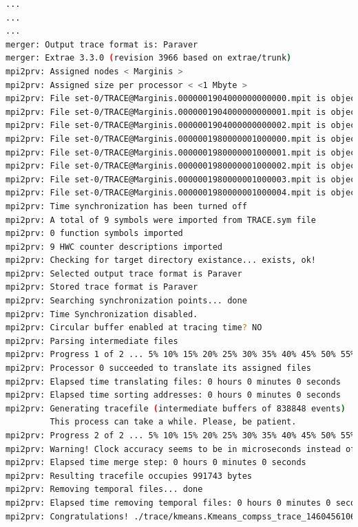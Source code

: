 \begin{lstlisting}[language=bash]
...
...
...
merger: Output trace format is: Paraver
merger: Extrae 3.3.0 (revision 3966 based on extrae/trunk)
mpi2prv: Assigned nodes < Marginis >
mpi2prv: Assigned size per processor < <1 Mbyte >
mpi2prv: File set-0/TRACE@Marginis.0000001904000000000000.mpit is object 1.1.1 on node Marginis assigned to processor 0
mpi2prv: File set-0/TRACE@Marginis.0000001904000000000001.mpit is object 1.1.2 on node Marginis assigned to processor 0
mpi2prv: File set-0/TRACE@Marginis.0000001904000000000002.mpit is object 1.1.3 on node Marginis assigned to processor 0
mpi2prv: File set-0/TRACE@Marginis.0000001980000001000000.mpit is object 1.2.1 on node Marginis assigned to processor 0
mpi2prv: File set-0/TRACE@Marginis.0000001980000001000001.mpit is object 1.2.2 on node Marginis assigned to processor 0
mpi2prv: File set-0/TRACE@Marginis.0000001980000001000002.mpit is object 1.2.3 on node Marginis assigned to processor 0
mpi2prv: File set-0/TRACE@Marginis.0000001980000001000003.mpit is object 1.2.4 on node Marginis assigned to processor 0
mpi2prv: File set-0/TRACE@Marginis.0000001980000001000004.mpit is object 1.2.5 on node Marginis assigned to processor 0
mpi2prv: Time synchronization has been turned off
mpi2prv: A total of 9 symbols were imported from TRACE.sym file
mpi2prv: 0 function symbols imported
mpi2prv: 9 HWC counter descriptions imported
mpi2prv: Checking for target directory existance... exists, ok!
mpi2prv: Selected output trace format is Paraver
mpi2prv: Stored trace format is Paraver
mpi2prv: Searching synchronization points... done
mpi2prv: Time Synchronization disabled.
mpi2prv: Circular buffer enabled at tracing time? NO
mpi2prv: Parsing intermediate files
mpi2prv: Progress 1 of 2 ... 5% 10% 15% 20% 25% 30% 35% 40% 45% 50% 55% 60% 65% 70% 75% 80% 85% 90% 95% done
mpi2prv: Processor 0 succeeded to translate its assigned files
mpi2prv: Elapsed time translating files: 0 hours 0 minutes 0 seconds
mpi2prv: Elapsed time sorting addresses: 0 hours 0 minutes 0 seconds
mpi2prv: Generating tracefile (intermediate buffers of 838848 events)
         This process can take a while. Please, be patient.
mpi2prv: Progress 2 of 2 ... 5% 10% 15% 20% 25% 30% 35% 40% 45% 50% 55% 60% 65% 70% 75% 80% 85% 90% 95% done
mpi2prv: Warning! Clock accuracy seems to be in microseconds instead of nanoseconds.
mpi2prv: Elapsed time merge step: 0 hours 0 minutes 0 seconds
mpi2prv: Resulting tracefile occupies 991743 bytes
mpi2prv: Removing temporal files... done
mpi2prv: Elapsed time removing temporal files: 0 hours 0 minutes 0 seconds
mpi2prv: Congratulations! ./trace/kmeans.Kmeans_compss_trace_1460456106.prv has been generated.

\end{lstlisting}
